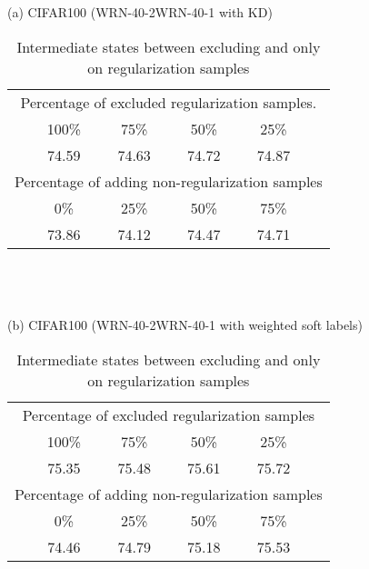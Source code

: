 \documentclass{article} \usepackage{iclr2021_conference,times}
\begin{document}
\begin{table}
\caption{Intermediate states between excluding and only on regularization samples}\label{tab:intermediate}
\begin{center}
(a) CIFAR100 (WRN-40-2WRN-40-1 with KD)\\
\begin{tabular}{cccccc}
\toprule
\multicolumn{6}{c}{Percentage of excluded regularization samples.}
\\
&100\% & 75\% & 50\% & 25\% &\\ \midrule
\qquad\qquad&74.59 & 74.63 & 74.72 & 74.87 &\\
\toprule
\multicolumn{6}{c}{Percentage of adding non-regularization samples}
\\
&0\% & 25\% & 50\% & 75\% &\\ \midrule
\qquad\qquad&73.86 & 74.12 & 74.47 & 74.71 &\\
\bottomrule
\end{tabular} \\ ~\\~\\
(b) CIFAR100 (WRN-40-2WRN-40-1 with weighted soft labels)\\
\begin{tabular}{cccccc}
\toprule
\multicolumn{6}{c}{Percentage of excluded regularization samples}
\\
&100\% & 75\% & 50\% & 25\% &\\ \midrule
\qquad\qquad&75.35 & 75.48 & 75.61 & 75.72 &\\
\toprule
\multicolumn{6}{c}{Percentage of adding non-regularization samples}
\\
&0\% & 25\% & 50\% & 75\% &\\ \midrule
\qquad\qquad&74.46 & 74.79 & 75.18 & 75.53 &\\
\bottomrule
\end{tabular} 
\end{center}
\end{table}
\end{document}
